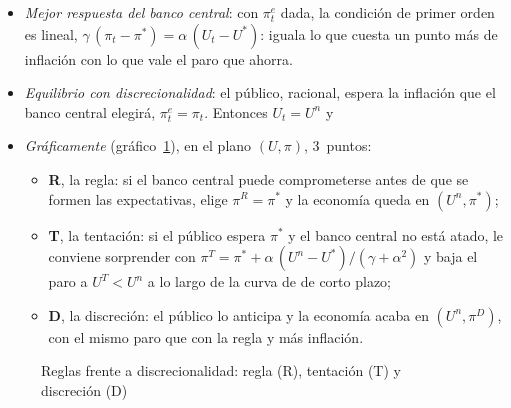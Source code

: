 \documentclass[11pt]{article}
\begin{document}
\begin{itemize}
\item \emph{Mejor respuesta del banco central}: con $\pi^e_t$ dada, la condición de primer orden es lineal, $\gamma\,(\pi_t-\pi^*)=\alpha\,(U_t-U^*)$: iguala lo que cuesta un punto más de inflación con lo que vale el paro que ahorra.
\item \emph{Equilibrio con discrecionalidad}: el público, racional, espera la inflación que el banco central elegirá, $\pi^e_t=\pi_t$. Entonces $U_t=U^n$ y
\item \emph{Gráficamente} (gráfico~\ref{fig:barro-gordon}), en el plano $(U,\pi)$, 3~puntos:
  \begin{itemize}
  \item \textbf{R}, la regla: si el banco central puede comprometerse antes de que se formen las expectativas, elige $\pi^R=\pi^*$ y la economía queda en $(U^n,\pi^*)$;
  \item \textbf{T}, la tentación: si el público espera $\pi^*$ y el banco central no está atado, le conviene sorprender con $\pi^T=\pi^*+\alpha\,(U^n-U^*)/(\gamma+\alpha^2)$ y baja el paro a $U^T<U^n$ a lo largo de la curva de  de corto plazo;
  \item \textbf{D}, la discreción: el público lo anticipa y la economía acaba en $(U^n,\pi^D)$, con el mismo paro que con la regla y más inflación.
  \end{itemize}
\end{itemize}

\begin{figure}[H]
\centering
\caption{Reglas frente a discrecionalidad: regla (R), tentación (T) y discreción (D)}\label{fig:barro-gordon}
\end{figure}
\end{document}
